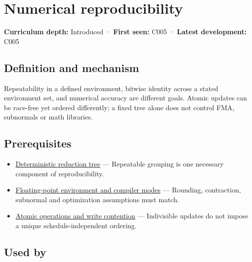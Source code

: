 \hypertarget{appendix-5f1a2c3f97ff}{}\label{referencestart:appendix-5f1a2c3f97ff}
\section{Numerical reproducibility}\label{appendix-5f1a2c3f97ff-numerical-reproducibility}

\textbf{Curriculum depth:} Introduced · \textbf{First seen:} C005 · \textbf{Latest development:} C005

\begin{allmightroledefinition}

\subsection{Definition and mechanism}\label{appendix-5f1a2c3f97ff-definition-and-mechanism}

Repeatability in a defined environment, bitwise identity across a stated environment set, and numerical accuracy are different goals. Atomic updates can be race-free yet ordered differently; a fixed tree alone does not control FMA, subnormals or math libraries.

\end{allmightroledefinition}

\subsection{Prerequisites}\label{appendix-5f1a2c3f97ff-prerequisites}

\begin{itemize}
\tightlist
\item
  \hyperref[appendix-4c8e0238e7ee]{Deterministic reduction tree} --- Repeatable grouping is one necessary component of reproducibility.
\item
  \hyperref[appendix-f11d1a521253]{Floating-point environment and compiler modes} --- Rounding, contraction, subnormal and optimization assumptions must match.
\item
  \hyperref[appendix-e12d1b03fefb]{Atomic operations and write contention} --- Indivisible updates do not impose a unique schedule-independent ordering.
\end{itemize}

\subsection{Used by}\label{appendix-5f1a2c3f97ff-used-by}

